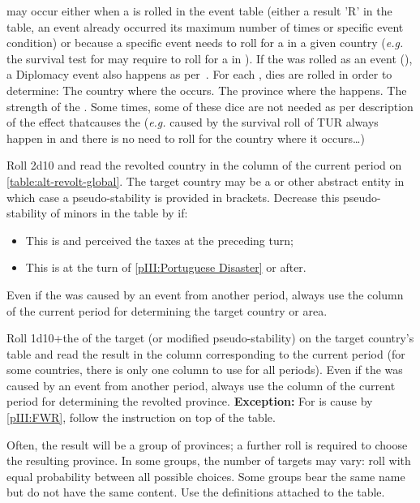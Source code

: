 \aparag \REVOLT may occur either when a \RD is rolled in the event table
(either a result 'R' in the table, an event already occurred its maximum
number of times or specific event condition) or because a specific event
needs to roll for a \REVOLT in a given country (\emph{e.g.} the survival
test for \TUR may require to roll for a \REVOLT in \paysmajeurTurquie).
\aparag If the \REVOLT was rolled as an event (\RD), a Diplomacy event
also happens as per~.
\aparag For each \REVOLT , dies are rolled in order to determine:
\bparag The country where the \REVOLT occurs.
\bparag The province where the \REVOLT happens.
\bparag The strength of the \REVOLT.
\bparag Some times, some of these dice are not needed as per
description of the effect thatcauses the \REVOLT (\emph{e.g.} \REVOLT
caused by the survival roll of TUR always happen in \paysmajeurTurquie
and there is no need to roll for the country where it occurs\ldots)

\aparag[Country] Roll 2d10 and read the revolted country in the column
of the current period on \ref{table:alt-revolt-global}. The target
country may be a \MIN or other abstract entity in which case a
pseudo-stability is provided in brackets.
\bparag Decrease this pseudo-stability of minors in the table by
 if:
\begin{itemize}
\item This is \HOLhol and \SPA perceived the taxes at the preceding
  turn;
\item This is \PORpor at the turn of \ref{pIII:Portuguese Disaster} or
  after.
\end{itemize}
\bparag Even if the \REVOLT was caused by an event from another period,
always use the column of the current period for determining the target
country or area.

\aparag[Location] Roll 1d10+the \STAB of the target (or modified
pseudo-stability) on the target country's table and read the result in
the column corresponding to the current period (for some countries,
there is only one column to use for all periods).
\bparag Even if the \REVOLT was caused by an event from another period,
always use the column of the current period for determining the revolted
province.
\bparag \textbf{Exception:} For \REVOLT is \FRA cause by \ref{pIII:FWR},
follow the instruction on top of the table.

\aparag[Groups] Often, the result will be a group of provinces; a
further roll is required to choose the resulting province.
\bparag In some groups, the number of targets may vary: roll with equal
probability between all possible choices.
\bparag Some groups bear the same name but do not have the same
content. Use the definitions attached to the table.

